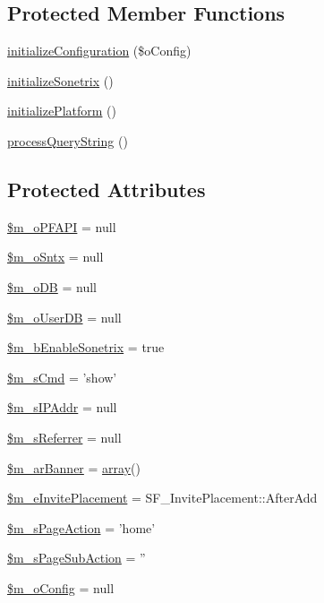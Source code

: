 \subsection*{Protected Member Functions}
\begin{DoxyCompactItemize}
\item 
\hyperlink{classSF__App__02_ad0a0692ff1a11536ebbcf3ec058b28ba}{initializeConfiguration} (\$oConfig)
\item 
\hyperlink{classSF__App__02_a074545d4bc47f611f84f1a7852801d57}{initializeSonetrix} ()
\item 
\hyperlink{classSF__App__02_a96b0f4bab679378904506e1a106c4e60}{initializePlatform} ()
\item 
\hyperlink{classSF__App__02_aa40909289ffd00ccc071d938f586fc47}{processQueryString} ()
\end{DoxyCompactItemize}
\subsection*{Protected Attributes}
\begin{DoxyCompactItemize}
\item 
\hyperlink{classSF__App__02_a23d5b5190ee32c4eb8fff028844b1fa6}{\$m\_\-oPFAPI} = null
\item 
\hyperlink{classSF__App__02_a22d1091f94c58e3533304abe3eb9e9fe}{\$m\_\-oSntx} = null
\item 
\hyperlink{classSF__App__02_af0fd242fc474881efab473522eec0748}{\$m\_\-oDB} = null
\item 
\hyperlink{classSF__App__02_a480a834e33015cc9a001d1d84972bb12}{\$m\_\-oUserDB} = null
\item 
\hyperlink{classSF__App__02_a55534a049a693ced372dba4331e5e9bd}{\$m\_\-bEnableSonetrix} = true
\item 
\hyperlink{classSF__App__02_a21ffd6ebc459ccba9514cbaee05b2ece}{\$m\_\-sCmd} = 'show'
\item 
\hyperlink{classSF__App__02_a2db945fecc9d0f95e19093d7829be78d}{\$m\_\-sIPAddr} = null
\item 
\hyperlink{classSF__App__02_a251ed856d45aa28d717a012291b71d26}{\$m\_\-sReferrer} = null
\item 
\hyperlink{classSF__App__02_a03606a66e78d358c6094f05f0857845d}{\$m\_\-arBanner} = \hyperlink{list_8php_aa3205d038c7f8feb5c9f01ac4dfadc88}{array}()
\item 
\hyperlink{classSF__App__02_a78a5b97e38e7a2bc9e36cca0a97a2cca}{\$m\_\-eInvitePlacement} = SF\_\-InvitePlacement::AfterAdd
\item 
\hyperlink{classSF__App__02_a82cc1f3844569fa451cac5abc03b1a4d}{\$m\_\-sPageAction} = 'home'
\item 
\hyperlink{classSF__App__02_a980e6fd9e83172281b1e6dac50f16e9c}{\$m\_\-sPageSubAction} = ''
\item 
\hyperlink{classSF__App__02_a0af2b37a09c1015be10cfa60f3f1d1b9}{\$m\_\-oConfig} = null
\end{DoxyCompactItemize}


